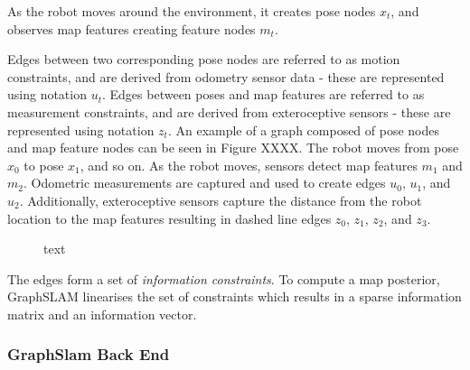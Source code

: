 \documentclass[a4paper]{article}
\begin{document}
As the robot moves around the environment, it creates pose nodes $x_t$, and observes map features creating feature nodes $m_t$. 



Edges between two corresponding pose nodes are referred to as motion constraints, and are derived from odometry sensor data - these are represented using notation $u_t$. Edges between poses and map features are referred to as measurement constraints, and are derived from exteroceptive sensors - these are represented using notation $z_t$. An example of a graph composed of pose nodes and map feature nodes can be seen in Figure XXXX. The robot moves from pose $x_0$ to pose $x_1$, and so on. As the robot moves, sensors detect map features $m_1$ and $m_2$. Odometric measurements are captured and used to create edges $u_0$, $u_1$, and $u_2$. Additionally, exteroceptive sensors capture the distance from the robot location to the map features resulting in dashed line edges $z_0$, $z_1$, $z_2$, and $z_3$. 
\begin{figure}[h]
\centering
{}
\caption{text}
\end{figure}

The edges form a set of \textit{information constraints}. To compute a map posterior, GraphSLAM linearises the set of constraints which results in a sparse information matrix and an information vector. 

\subsubsection{GraphSlam Back End}
\end{document}
